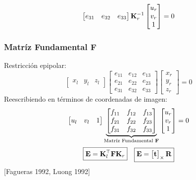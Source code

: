 \begin{frame}
{\begin{equation*}
\begin{bmatrix}
            e_{31} & e_{32} & e_{33}
        \end{bmatrix}
        \boldsymbol{\mathbf{K}}_r^{-1}
        \begin{bmatrix} u_r \\ v_r \\ 1 \end{bmatrix} = 0
    \end{equation*}
    }

\end{frame}

\begin{frame}
    \frametitle{Matríz Fundamental $\mathbf{F}$}
    Restricción epipolar:
    $$
    \begin{bmatrix} x_l & y_l & z_l \end{bmatrix}
    \begin{bmatrix}
        e_{11} & e_{12} & e_{13} \\
        e_{21} & e_{22} & e_{23} \\
        e_{31} & e_{32} & e_{33}
    \end{bmatrix}
    \begin{bmatrix} x_r \\ y_r \\ z_r \end{bmatrix} = 0
    $$
    Reescribiendo en términos de coordenadas de imagen:
    $$
    \begin{bmatrix} u_l & v_l & 1 \end{bmatrix}
    \underbrace{\begin{bmatrix}
        f_{11} & f_{12} & f_{13} \\
        f_{21} & f_{22} & f_{23} \\
        f_{31} & f_{32} & f_{33}
    \end{bmatrix}}_{\text{Matríz Fundamental } \boldsymbol{\mathbf{F}}}
    \begin{bmatrix} u_r \\ v_r \\ 1 \end{bmatrix} = 0
    $$
    $$
    \boxed{\boldsymbol{\mathbf{E}} = \boldsymbol{\mathbf{K}}_l^{\top} \boldsymbol{\mathbf{F}} \boldsymbol{\mathbf{K}}_r}
    \quad
    \boxed{\boldsymbol{\mathbf{E}} = \begin{bmatrix}\boldsymbol{\mathbf{t}}\end{bmatrix}_{\times} \boldsymbol{\mathbf{R}}}
    $$
    \footnotesize{[Fagueras 1992, Luong 1992]}
\end{frame}


